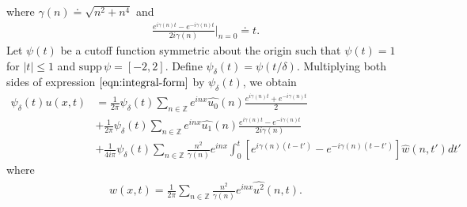 \documentclass[12pt,reqno]{amsart}
\numberwithin{equation}{section}  %
\renewcommand{\cref}{\Cref}
\newcommand{\zz}{\mathbb{Z}}
\newcommand{\wh}{\widehat}
\begin{document}
%
%
where $\gamma(n) \doteq \sqrt{n^{2} + n^{4}}$ and
%
%
\begin{equation*}
\begin{split}
  \frac{e^{i\gamma(n)t} - e^{-i\gamma(n)t}}{2 i \gamma(n)} \vert_{n=0} \doteq t.
\end{split}
\end{equation*}
%
%
Let $\psi(t)$ be a cutoff function symmetric about the 
origin such that $\psi(t) = 1$ for $|t| \le 1$ and $\text{supp} \, \psi 
= [-2, 2 ]$.
Define $\psi_{\delta}(t) = \psi(t/\delta)$.
Multiplying both sides of expression
$\cref{eqn:integral-form}$ by $\psi_{\delta}(t)$, we obtain
\begin{equation}
\label{ct}
  \begin{split}
   \psi_{\delta}(t) u(x,t)
    & = \frac{1}{2\pi}\psi_{\delta}(t)\sum_{n \in \zz} e^{inx} \wh{u_{0}}(n) \frac{e^{i\gamma(n)t} + e^{-i\gamma(n)t}}{2} 
    \\
    & + \frac{1}{2 \pi}\psi_{\delta}(t)\sum_{n \in \zz} e^{inx}
    \wh{u_{1}}(n)\frac{e^{i\gamma(n)t} - e^{-i\gamma(n)t}}{2 i \gamma(n)} 
    \\
    & + \frac{1}{4 i \pi} \psi_{\delta}(t)\sum_{n \in \zz} \frac{n^{2}}{\gamma(n)} e^{inx}
    \int_{0}^{t}[e^{i\gamma(n)(t-t')}-e^{-i\gamma(n)(t-t')}]
    \wh{{w}}(n, t') dt'
  \end{split}
\end{equation}
where
%
%
\begin{equation*}
\begin{split}
w(x,t) = \frac{1}{2 \pi} \sum_{n \in \zz} \frac{n^{2}}{\gamma(n)}e^{inx} \wh{u^{2}}(n, t).
\end{split}
\end{equation*}
%
%
\end{document}
